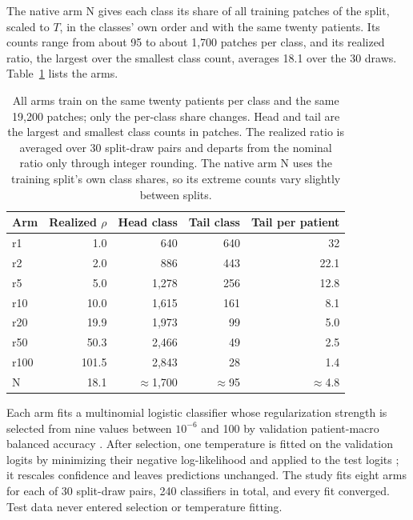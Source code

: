 \documentclass[11pt]{article}
\begin{document}
The native arm N gives each class its share of all training patches of the split, scaled to $T$, in the classes' own order and with the same twenty patients. Its counts range from about 95 to about 1,700 patches per class, and its realized ratio, the largest over the smallest class count, averages 18.1 over the 30 draws. Table~\ref{tab:arms} lists the arms.

\begin{table}[htbp]
\centering
\renewcommand{\arraystretch}{1.15}
\begin{tabular}{@{}lrrrr@{}}
\toprule
Arm & Realized $\rho$ & Head class & Tail class & Tail per patient \\
\midrule
r1 & 1.0 & 640 & 640 & 32 \\
r2 & 2.0 & 886 & 443 & 22.1 \\
r5 & 5.0 & 1,278 & 256 & 12.8 \\
r10 & 10.0 & 1,615 & 161 & 8.1 \\
r20 & 19.9 & 1,973 & 99 & 5.0 \\
r50 & 50.3 & 2,466 & 49 & 2.5 \\
r100 & 101.5 & 2,843 & 28 & 1.4 \\
N & 18.1 & $\approx$1,700 & $\approx$95 & $\approx$4.8 \\
\bottomrule
\end{tabular}
\caption{All arms train on the same twenty patients per class and the same 19,200 patches; only the per-class share changes. Head and tail are the largest and smallest class counts in patches. The realized ratio is averaged over 30 split-draw pairs and departs from the nominal ratio only through integer rounding. The native arm N uses the training split's own class shares, so its extreme counts vary slightly between splits.}
\label{tab:arms}
\end{table}

\noindent Each arm fits a multinomial logistic classifier whose regularization strength is selected from nine values between $10^{-6}$ and 100 by validation patient-macro balanced accuracy \citep{queisler2026patientShortage}. After selection, one temperature is fitted on the validation logits by minimizing their negative log-likelihood and applied to the test logits \citep{guo2017calibration}; it rescales confidence and leaves predictions unchanged. The study fits eight arms for each of 30 split-draw pairs, 240 classifiers in total, and every fit converged. Test data never entered selection or temperature fitting.
\end{document}
